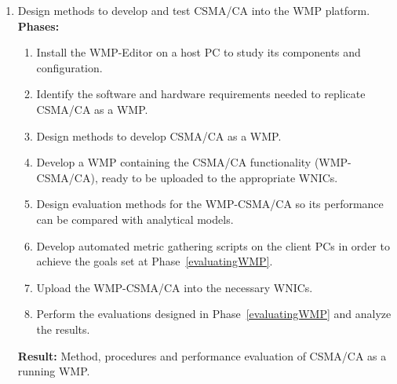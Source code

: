 \begin{enumerate}
% 	
	
	\item Design methods to develop and test CSMA/CA into the WMP platform.\label{learningWMP}\\
	
	{\bfseries Phases:}
	\begin{enumerate}
		\item Install the WMP-Editor on a host PC to study its components and configuration.\label{installWMP}
		\item Identify the software and hardware requirements needed to replicate CSMA/CA as a WMP.\label{WMPRequirements}
		\item Design methods to develop CSMA/CA as a WMP.\label{WMPCSMA-CA}
		\item Develop a WMP containing the CSMA/CA functionality (WMP-CSMA/CA), ready to be uploaded to the appropriate WNICs.
		\item Design evaluation methods for the WMP-CSMA/CA so its performance can be compared with analytical models.\label{evaluatingWMP}
		\item Develop automated metric gathering scripts on the client PCs in order to achieve the goals set at Phase~\ref{evaluatingWMP}.
		\item Upload the WMP-CSMA/CA into the necessary WNICs.
		\item Perform the evaluations designed in Phase~\ref{evaluatingWMP} and analyze the results.\label{WMPExperiment}\\
	\end{enumerate}
	{\bfseries Result:} Method, procedures and performance evaluation of CSMA/CA as a running WMP.\\


\end{enumerate}
